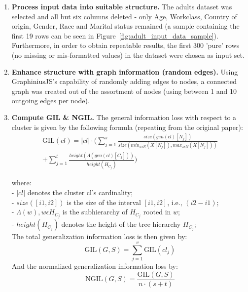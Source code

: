 \documentclass{llncs}
\providecommand{\abs}[1]{\lvert#1\rvert}
\begin{document}
\begin{enumerate}
	\item \textbf{Process input data into suitable structure.} The adults dataset was selected and all but six columns deleted - only Age, Workclass, Country of origin, Gender, Race and Marital status remained (a sample containing the first 19 rows can be seen in Figure~\ref{fig:adult_input_data_sample}). Furthermore, in order to obtain repeatable results, the first 300 'pure' rows (no missing or mis-formatted values) in the dataset were chosen as input set.
	
	\item \textbf{Enhance structure with graph information (random edges).} Using GraphiniusJS's capability of randomly adding edges to nodes, a connected graph was created out of the assortment of nodes (using between 1 and 10 outgoing edges per node).
	

	\item \textbf{Compute GIL \& NGIL.} The general information loss with respect to a cluster is given by the following formula (repeating from the original paper):
	\begin{equation*}
    \begin{split}
	\text{GIL}(cl) = \abs{cl} \cdot (\sum_{j=1}^{s} \frac{size(gen(cl)[N_j])}{size(min_{x \epsilon N} (X[N_j]), max_{x \epsilon N} (X[N_j]))} \\ 
    + \sum_{j=1}^{t} \frac{height(\Lambda(gen(cl)[C_j]))}{height(H_{C_j})})    
    \end{split}    
	\end{equation*}
    
    
	where:\\
	- $\abs{cl}$ denotes the cluster cl's cardinality; \\
	- $size([i1,i2])$ is the size of the interval $[i1,i2]$, i.e., $(i2-i1)$; \\
	- $\Lambda(w), w \epsilon H_{C_j}$ is the subhierarchy of $H_{C_j}$ rooted in $w$; \\
	- $height(H_{C_j})$ denotes the height of the tree hierarchy $H_{C_j}$; \\
	
	The total generalization information loss is then given by:
	\begin{equation*}
	\text{GIL}(G,S) = \sum_{j=1}^{v} \text{GIL}(cl_j)
	\end{equation*}
	And the normalized generalization information loss by:
	\begin{equation*}
	\text{NGIL}(G,S) = \frac{\text{GIL}(G,S)}{n \cdot (s+t)}
	\end{equation*}
	

\end{enumerate}
\end{document}
